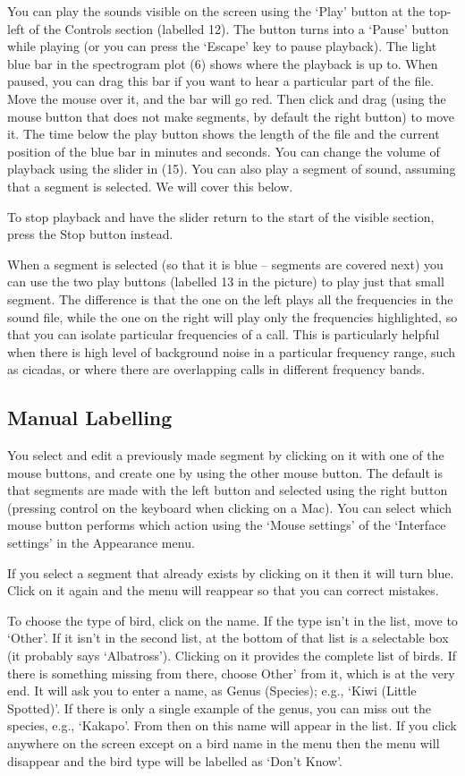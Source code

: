 \documentclass{article}
\begin{document}
You can play the sounds visible on the screen using the `Play' button at the top-left of the Controls section (labelled 12). The button turns into a `Pause' button while playing (or you can press the `Escape' key to pause playback). The light blue bar in the spectrogram plot (6)  shows where the playback is up to. When paused, you can drag this bar if you want to hear a particular part of the file. Move the mouse over it, and the bar will go red. Then click and drag (using the mouse button that does not make segments, by default the right button) to move it. The time below the play button shows the length of the file and the current position of the blue bar in minutes and seconds. You can change the volume of playback using the slider in (15). You can also play a segment of sound, assuming that a segment is selected. We will cover this below.

To stop playback and have the slider return to the start of the visible section, press the Stop button instead.

When a segment is selected (so that it is blue -- segments are covered next) you can use the two play buttons (labelled 13 in the picture) to play just that small segment. The difference is that the one on the left plays all the frequencies in the sound file, while the one on the right will play only the frequencies highlighted, so that you can isolate particular frequencies of a call. This is particularly helpful when there is high level of background noise in a particular frequency range, such as cicadas, or where there are overlapping calls in different frequency bands.

\subsection{Manual Labelling}

You select and edit a previously made segment by clicking on it with one of the mouse buttons,  and create one by using the other mouse button. The default is that segments are made with the left button and selected using the right button (pressing control on the keyboard when clicking on a Mac). You can select which mouse button performs which action using the `Mouse settings' of the `Interface settings' in the Appearance menu. 

If you select a segment that already exists by clicking on it then it will turn blue. Click on it again and the menu will reappear so that you can correct mistakes.

To choose the type of bird, click on the name. If the type isn't in the list, move to `Other'. If it isn't in the second list, at the bottom of that list is a selectable box (it probably says `Albatross'). Clicking on it provides the complete list of birds. If there is something missing from there, choose Other' from it, which is at the very end. It will ask you to enter a name, as Genus (Species); e.g., `Kiwi (Little Spotted)'. If there is only a single example of the genus, you can miss out the species, e.g., `Kakapo'. From then on this name will appear in the list. If you click anywhere on the screen except on a bird name in the menu then the menu will disappear and the bird type will be labelled as `Don't Know'. 
\end{document}
